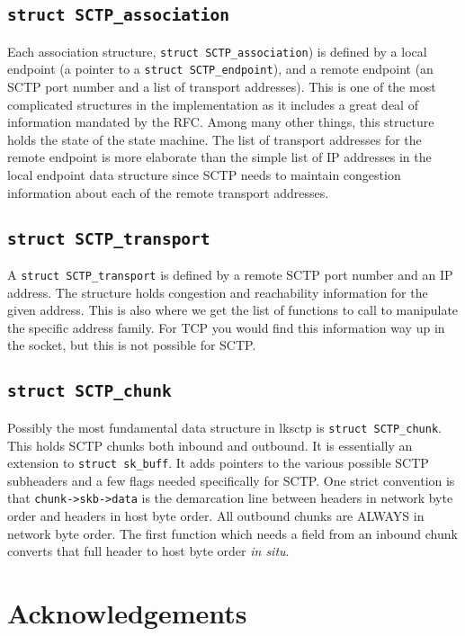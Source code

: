 \documentclass[twocolumn]{article}
\begin{document}
\subsection{\texttt{struct~SCTP\_association}}

Each association structure, \texttt{struct~SCTP\_association}) is defined
by a local endpoint (a pointer to a \texttt{struct~SCTP\_endpoint}), and
a remote endpoint (an SCTP port number and a list of transport
addresses).  This is one of the most complicated structures in the
implementation as it includes a great deal of information mandated by
the RFC.  Among many other things, this structure holds the state of
the state machine.  The list of transport addresses for the remote
endpoint is more elaborate than the simple list of IP addresses in the
local endpoint data structure since SCTP needs to maintain congestion
information about each of the remote transport addresses.

\subsection{\texttt{struct~SCTP\_transport}}

A \texttt{struct~SCTP\_transport} is defined by a remote SCTP port number
and an IP address.  The structure holds congestion and reachability
information for the given address.  This is also where we get the list 
of functions to call to manipulate the specific address family.  For
TCP you would find this information way up in the socket, but this is
not possible for SCTP.

\subsection{\texttt{struct~SCTP\_chunk}}

Possibly the most fundamental data structure in lksctp is
\texttt{struct~SCTP\_chunk}.  This holds SCTP chunks both inbound and
outbound.  It is essentially an extension to \texttt{struct~sk\_buff}.
It adds pointers to the various possible SCTP subheaders and a few
flags needed specifically for SCTP.  One strict convention is that
\texttt{chunk->skb->data} is the demarcation line between headers in
network byte order and headers in host byte order.  All outbound
chunks are ALWAYS in network byte order.  The first function which
needs a field from an inbound chunk converts that full header to host
byte order {\it in situ}.

\section{Acknowledgements}
\end{document}
